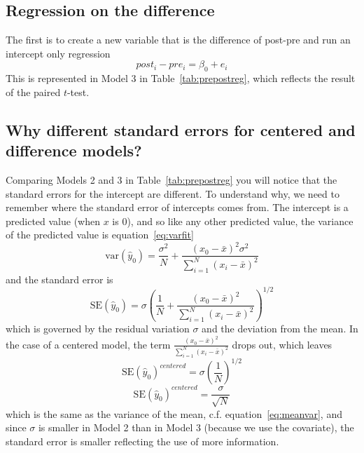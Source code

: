 \subsection{Regression on the difference}

The first is to create a new variable that is the difference of post-pre and run an intercept only regression
\begin{equation}
post_i - pre_i = \beta_0 + e_i
\end{equation}
This is represented in Model 3 in Table~\ref{tab:prepostreg}, which reflects the result of the paired $t$-test.

\subsection{Why different standard errors for centered and difference models?}

Comparing Models 2 and 3 in Table~\ref{tab:prepostreg} you will notice that the standard errors for the intercept are different. To understand why, we need to remember where the standard error of intercepts comes from. The intercept is a predicted value (when $x$ is 0), and so like any other predicted value, the variance of the predicted value is equation~\eqref{eq:varfit}
\[
\mbox{var}\left(\hat{y}_0\right)=\frac{\sigma^2}{N}+\frac{\left(x_0-\bar{x}\right)^2\sigma^2}{\sum_{i=1}^N\left(x_i-\bar{x}\right)^2}
\]
and the standard error is
\begin{equation}
\mbox{SE}\left(\hat{y}_0\right)=\sigma\left(\frac{1}{N}+\frac{\left(x_0-\bar{x}\right)^2}{\sum_{i=1}^N\left(x_i-\bar{x}\right)^2}\right)^{1/2}
\end{equation}
which is governed by the residual variation $\sigma$ and the deviation from the mean. In the case of a centered model, the term $\frac{\left(x_0-\bar{x}\right)^2}{\sum_{i=1}^N\left(x_i-\bar{x}\right)^2}$ drops out, which leaves
\begin{equation}
\mbox{SE}\left(\hat{y}_0\right)^{centered}=\sigma\left(\frac{1}{N}\right)^{1/2}
\end{equation}
\begin{equation}
\mbox{SE}\left(\hat{y}_0\right)^{centered}=\frac{\sigma}{\sqrt{N}}
\end{equation}
which is the same as the variance of the mean, c.f. equation~\eqref{eq:meanvar}, and since $\sigma$ is smaller in Model 2 than in Model 3 (because we use the covariate), the standard error is smaller reflecting the use of more information.

